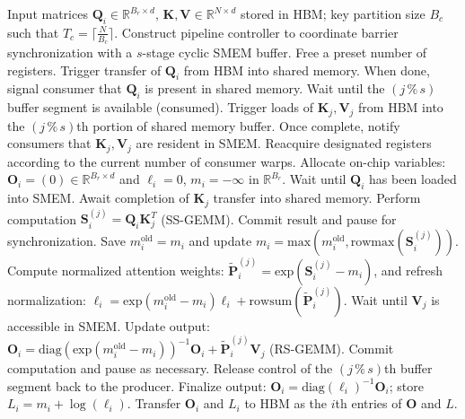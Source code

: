 \begin{algorithm}[H]
    \caption{\small\label{alg:flash3_wgmma_ws_only}\textsc{FlashAttention-3} Forward Computation \textbf{Excluding} Intra-Consumer Overlap -- CTA Perspective}
    \begin{algorithmic}[1]
\REQUIRE Input matrices $\mathbf{Q}_i \in \mathbb{R}^{B_r \times d}$, $\mathbf{K}, \mathbf{V} \in \mathbb{R}^{N \times d}$ stored in HBM; key partition size $B_c$ such that $T_c = \lceil \frac{N}{B_c} \rceil$.
\STATE Construct pipeline controller to coordinate barrier synchronization with a $s$-stage cyclic SMEM buffer.
\STATE Free a preset number of registers.
\STATE Trigger transfer of $\mathbf{Q}_i$ from HBM into shared memory.
\STATE When done, signal consumer that $\mathbf{Q}_i$ is present in shared memory.
    \STATE Wait until the $(j\,\%\,s)$ buffer segment is available (consumed).
    \STATE Trigger loads of $\mathbf{K}_j, \mathbf{V}_j$ from HBM into the $(j\,\%\,s)$th portion of shared memory buffer.
    \STATE Once complete, notify consumers that $\mathbf{K}_j, \mathbf{V}_j$ are resident in SMEM.
\ENDFOR
\ELSE 
\STATE Reacquire designated registers according to the current number of consumer warps.
\STATE Allocate on-chip variables: $\mathbf{O}_i = (0) \in \mathbb{R}^{B_r \times d}$ and $\ell_i = 0$, $m_i = -\infty$ in $\mathbb{R}^{B_r}$.
\STATE Wait until $\mathbf{Q}_i$ has been loaded into SMEM.
\STATE Await completion of $\mathbf{K}_j$ transfer into shared memory.
\STATE Perform computation $\mathbf{S}_i^{(j)} = \mathbf{Q}_i \mathbf{K}_j^T$ (SS-GEMM). Commit result and pause for synchronization. \label{alg:ws_only_gemm1}
\STATE Save $m_i^{\mathrm{old}} = m_i$ and update $m_i = \mathrm{max}(m_i^{\mathrm{old}}, \mathrm{rowmax}(\mathbf{S}_i^{(j)}))$. \label{code-ws:softmax_start}
\STATE Compute normalized attention weights: $\widetilde{\mathbf{P}}_i^{(j)} = \mathrm{exp}(\mathbf{S}_i^{(j)} - m_i)$, and refresh normalization: $\ell_i = \mathrm{exp}(m_i^{\mathrm{old}} - m_i)\ell_i + \mathrm{rowsum}(\widetilde{\mathbf{P}}_i^{(j)})$. \label{code-ws:softmax_end}
\STATE Wait until $\mathbf{V}_j$ is accessible in SMEM.
\STATE Update output: $\mathbf{O}_i = \mathrm{diag}(\mathrm{exp}(m_i^{\mathrm{old}} - m_i))^{-1} \mathbf{O}_i + \widetilde{\mathbf{P}}_i^{(j)} \mathbf{V}_j$ (RS-GEMM). Commit computation and pause as necessary. \label{alg:ws_only_gemm2}
\STATE Release control of the $(j\,\%\,s)$th buffer segment back to the producer.
\ENDFOR
\STATE Finalize output: $\mathbf{O}_i = \mathrm{diag}(\ell_i)^{-1} \mathbf{O}_i$; store $L_i = m_i + \log(\ell_i)$.
\STATE Transfer $\mathbf{O}_i$ and $L_i$ to HBM as the $i$th entries of $\mathbf{O}$ and $L$.
\ENDIF
\end{algorithmic}
\end{algorithm}

